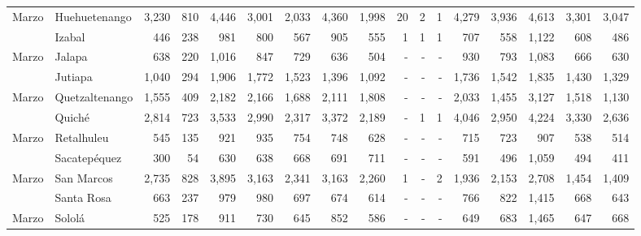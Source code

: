 \begin{landscape}
\begin{center}
\begin{longtable}{llrrrrrrrrrrrrrrr}
			\multicolumn{1}{l}{	\footnotesize	 Marzo 	}&	 Huehuetenango 	&	 3,230 	&	 810 	&	 4,446 	&	 3,001 	&	 2,033 	&	 4,360 	&	 1,998 	&	 20 	&	 2 	&	 1 	&	 4,279 	&	 3,936 	&	 4,613 	&	 3,301 	&	 3,047 	\\
			\rowcolor{color1!5!white}\multicolumn{1}{l}{	\footnotesize	 Marzo 	}&	 Izabal 	&	 446 	&	 238 	&	 981 	&	 800 	&	 567 	&	 905 	&	 555 	&	 1 	&	 1 	&	 1 	&	 707 	&	 558 	&	 1,122 	&	 608 	&	 486 	\\
			\multicolumn{1}{l}{	\footnotesize	 Marzo 	}&	 Jalapa 	&	 638 	&	 220 	&	 1,016 	&	 847 	&	 729 	&	 636 	&	 504 	&	 -   	&	 -   	&	 -   	&	 930 	&	 793 	&	 1,083 	&	 666 	&	 630 	\\
			\rowcolor{color1!5!white}\multicolumn{1}{l}{	\footnotesize	 Marzo 	}&	 Jutiapa 	&	 1,040 	&	 294 	&	 1,906 	&	 1,772 	&	 1,523 	&	 1,396 	&	 1,092 	&	 -   	&	 -   	&	 -   	&	 1,736 	&	 1,542 	&	 1,835 	&	 1,430 	&	 1,329 	\\
			\multicolumn{1}{l}{	\footnotesize	 Marzo 	}&	 Quetzaltenango 	&	 1,555 	&	 409 	&	 2,182 	&	 2,166 	&	 1,688 	&	 2,111 	&	 1,808 	&	 -   	&	 -   	&	 -   	&	 2,033 	&	 1,455 	&	 3,127 	&	 1,518 	&	 1,130 	\\
			\rowcolor{color1!5!white}\multicolumn{1}{l}{	\footnotesize	 Marzo 	}&	 Quiché 	&	 2,814 	&	 723 	&	 3,533 	&	 2,990 	&	 2,317 	&	 3,372 	&	 2,189 	&	 -   	&	 1 	&	 1 	&	 4,046 	&	 2,950 	&	 4,224 	&	 3,330 	&	 2,636 	\\
			\multicolumn{1}{l}{	\footnotesize	 Marzo 	}&	 Retalhuleu 	&	 545 	&	 135 	&	 921 	&	 935 	&	 754 	&	 748 	&	 628 	&	 -   	&	 -   	&	 -   	&	 715 	&	 723 	&	 907 	&	 538 	&	 514 	\\
			\rowcolor{color1!5!white}\multicolumn{1}{l}{	\footnotesize	 Marzo 	}&	 Sacatepéquez 	&	 300 	&	 54 	&	 630 	&	 638 	&	 668 	&	 691 	&	 711 	&	 -   	&	 -   	&	 -   	&	 591 	&	 496 	&	 1,059 	&	 494 	&	 411 	\\
			\multicolumn{1}{l}{	\footnotesize	 Marzo 	}&	 San Marcos 	&	 2,735 	&	 828 	&	 3,895 	&	 3,163 	&	 2,341 	&	 3,163 	&	 2,260 	&	 1 	&	 -   	&	 2 	&	 1,936 	&	 2,153 	&	 2,708 	&	 1,454 	&	 1,409 	\\
			\rowcolor{color1!5!white}\multicolumn{1}{l}{	\footnotesize	 Marzo 	}&	 Santa Rosa 	&	 663 	&	 237 	&	 979 	&	 980 	&	 697 	&	 674 	&	 614 	&	 -   	&	 -   	&	 -   	&	 766 	&	 822 	&	 1,415 	&	 668 	&	 643 	\\
			\multicolumn{1}{l}{	\footnotesize	 Marzo 	}&	 Sololá 	&	 525 	&	 178 	&	 911 	&	 730 	&	 645 	&	 852 	&	 586 	&	 -   	&	 -   	&	 -   	&	 649 	&	 683 	&	 1,465 	&	 647 	&	 668 	\\

\end{longtable}
\end{center}
\end{landscape}
